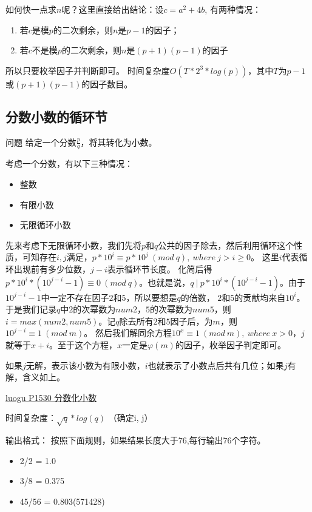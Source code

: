 如何快一点求$n$呢？这里直接给出结论：设$c=a^2+4b$, 有两种情况：
\begin{enumerate}
	\item 若$c$是模$p$的二次剩余，则$n$是$p-1$的因子；
	\item 若$c$不是模$p$的二次剩余，则$n$是$(p+1)(p-1)$的因子
\end{enumerate}
所以只要枚举因子并判断即可。
时间复杂度$O(T*2^3*log(p))$，其中$T$为$p-1$或$(p+1)(p-1)$的因子数目。

\subsection{分数小数的循环节}
\begin{custom}{问题}
给定一个分数$\frac{p}{q}$，将其转化为小数。
\end{custom}

\begin{solution}
考虑一个分数，有以下三种情况：
\begin{itemize}
	\item 整数
	\item 有限小数
	\item 无限循环小数
\end{itemize}

先来考虑下无限循环小数，我们先将$p$和$q$公共的因子除去，然后利用循环这个性质，可知存在$i,j$满足，$p*10^i \equiv p*10^j \ (mod \ q), \ where\ j>i\ge0$。
{\heiti 这里$i$代表循环出现前有多少位数，$j-i$表示循环节长度。}
化简后得$p*10^i*(10^{j-i}-1) \equiv 0\   (mod \ q)$。也就是说，$q\ |\ p*10^i*(10^{j-i}-1)$。由于$10^{j-i}-1$中一定不存在因子$2$和$5$，所以要想是$q$的倍数，
$2$和$5$的贡献均来自$10^i$。于是我们记录$q$中$2$的次幂数为$num2$，$5$的次幂数为$num5$，则$i = max(num2,num5)$。记$q$除去所有$2$和$5$因子后，为$m$，则$10^{j-i}\equiv 1 \ (mod\ m)$。
然后我们解同余方程$10^x\equiv 1\ (mod\ m),\ where\ x>0$，$j$就等于$x+i$。至于这个方程，$x$一定是$\varphi(m)$的因子，枚举因子判定即可。

如果$j$无解，表示该小数为有限小数，$i$也就表示了小数点后共有几位；如果$j$有解，含义如上。
\end{solution}

\href{https://www.luogu.org/problem/P1530}{luogu P1530 分数化小数}

时间复杂度：$\sqrt{q}*log(q)$ \quad （确定i, j）

输出格式： 按照下面规则，如果结果长度大于76,每行输出76个字符。
\begin{itemize}
	\item 2/2 = 1.0
	\item 3/8 = 0.375
	\item 45/56 = 0.803(571428)
\end{itemize}

